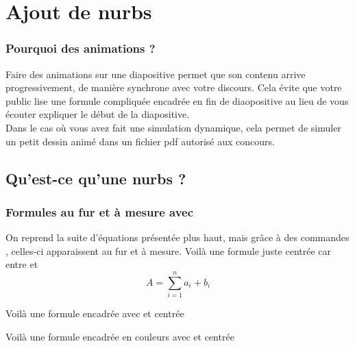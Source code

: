 \section{Ajout de nurbs}

\begin{frame}
  \frametitle{Pourquoi des animations ?}
  
  \begin{itemize}
   \flch Faire des animations sur une diapositive permet que son contenu arrive progressivement, de manière synchrone avec votre discours.
  Cela évite que votre public lise une formule compliquée encadrée en fin de diaopositive au lieu de vous écouter expliquer le début de la diapositive.\\
  \flch Dans le cas où vous avez fait une simulation dynamique, cela permet de simuler un petit dessin animé dans un fichier pdf autorisé aux concours.
  \end{itemize}
\end{frame}

\subsection{Qu'est-ce qu'une nurbs ?}


\begin{frame}
	\frametitle{Formules au fur et à mesure avec \lin{\pause}}
	On reprend la suite d'équations présentée plus haut, mais grâce à des commandes \lin{\pause}, celles-ci apparaissent au fur et à mesure.
	\pause
	Voilà une formule juste centrée car entre \lin{$$} et \lin{$$} 
	$$ A  = \sum_{i=1}^{n} a_i +b_i$$
	
	\pause
	Voilà une formule encadrée avec \lin{\fbox}et centrée 
	\begin{center}
	\end{center}
	\pause
	
	Voilà une formule encadrée en couleurs avec \lin{\fcolorbox} et centrée
	\begin{center}
	\end{center}
\end{frame}

